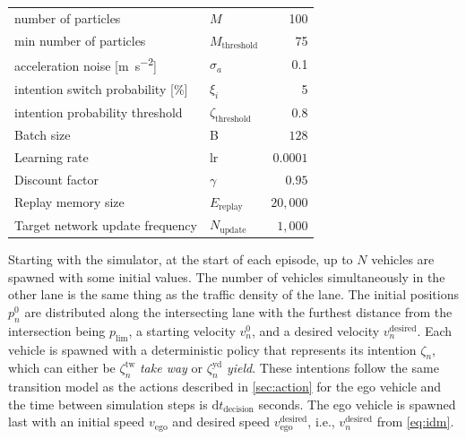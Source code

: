 \begin{table}[!bt]
\begin{tabular}{l l r}
    number of particles & $M$ & 100\\
    min number of particles & $M_\mathrm{threshold}$ & 75\\
    acceleration noise [\unit{\meter\per\second\squared}] & $\sigma_a$ & 0.1 \\
    intention switch probability [$\%$] & $\xi_i$ & 5 \\
    intention probability threshold & $\zeta_\text{threshold}$ & 0.8 \\
    \midrule
    
    Batch size & B & $128$ \\
    Learning rate & lr & $0.0001$ \\
    Discount factor & $\gamma$ & $0.95$\\
    Replay memory size & $E_\mathrm{replay}$ & $20{,}000$\\
    Target network update frequency & $N_\mathrm{update}$ & $1{,}000$\\


        \bottomrule
    \end{tabular}
\end{table}
Starting with the simulator, at the start of each episode, up to $N$ vehicles are spawned with some initial values. The number of vehicles simultaneously in the other lane is the same thing as the traffic density of the lane. The initial positions $p_n^0$ are distributed along the intersecting lane with the furthest distance from the intersection being $p_\mathrm{lim}$, a starting velocity $v_n^0$, and a desired velocity $v^\mathrm{desired}_n$. Each vehicle is spawned with a deterministic policy that represents its intention $\zeta_n$, which can either be $\zeta_n^\mathrm{tw}$ \textit{take way} or $\zeta_n^\mathrm{yd}$ \textit{yield}. These intentions follow the same transition model as the actions described in \ref{sec:action} for the ego vehicle and the time between simulation steps is $\mathrm{d}t_{\text{decision}}$ seconds.
The ego vehicle is spawned last with an initial speed $v_\mathrm{ego}$ and desired speed $v_\mathrm{ego}^\mathrm{desired}$, i.e., $v^\mathrm{desired}_n$ from \eqref{eq:idm}. 

